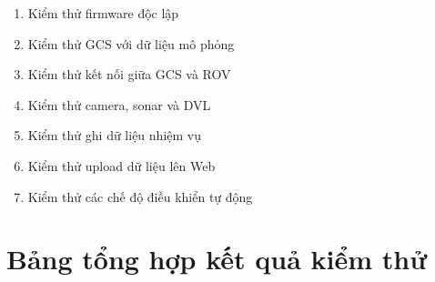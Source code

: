 \documentclass[../DoAn.tex]{subfiles}
\begin{document}
\begin{enumerate}
    \item Kiểm thử firmware độc lập
    
    \item Kiểm thử GCS với dữ liệu mô phỏng
    
    \item Kiểm thử kết nối giữa GCS và ROV
    
    \item Kiểm thử camera, sonar và DVL
    
    \item Kiểm thử ghi dữ liệu nhiệm vụ
    
    \item Kiểm thử upload dữ liệu lên Web
    
    \item Kiểm thử các chế độ điều khiển tự động
    
\end{enumerate}


\section{Bảng tổng hợp kết quả kiểm thử}
\end{document}
